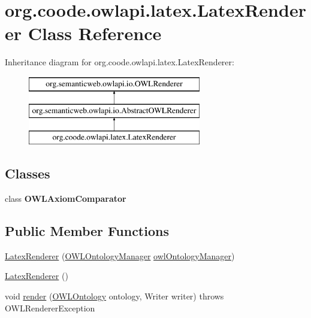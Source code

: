 \hypertarget{classorg_1_1coode_1_1owlapi_1_1latex_1_1_latex_renderer}{\section{org.\-coode.\-owlapi.\-latex.\-Latex\-Renderer Class Reference}
\label{classorg_1_1coode_1_1owlapi_1_1latex_1_1_latex_renderer}
}
Inheritance diagram for org.\-coode.\-owlapi.\-latex.\-Latex\-Renderer\-:\begin{figure}[H]
\begin{center}
\leavevmode
\includegraphics[height=3.000000cm]{classorg_1_1coode_1_1owlapi_1_1latex_1_1_latex_renderer}
\end{center}
\end{figure}
\subsection*{Classes}
\begin{DoxyCompactItemize}
\item 
class {\bfseries O\-W\-L\-Axiom\-Comparator}
\end{DoxyCompactItemize}
\subsection*{Public Member Functions}
\begin{DoxyCompactItemize}
\item 
\hyperlink{classorg_1_1coode_1_1owlapi_1_1latex_1_1_latex_renderer_a7705fd36118a316ac71867a61cd6c3a8}{Latex\-Renderer} (\hyperlink{interfaceorg_1_1semanticweb_1_1owlapi_1_1model_1_1_o_w_l_ontology_manager}{O\-W\-L\-Ontology\-Manager} \hyperlink{classorg_1_1semanticweb_1_1owlapi_1_1io_1_1_abstract_o_w_l_renderer_abb9888586f19a7a923cba542d99f1556}{owl\-Ontology\-Manager})
\item 
\hyperlink{classorg_1_1coode_1_1owlapi_1_1latex_1_1_latex_renderer_a4018e19fc4aa6b22cb26315f944852af}{Latex\-Renderer} ()
\item 
void \hyperlink{classorg_1_1coode_1_1owlapi_1_1latex_1_1_latex_renderer_a2eba9a5959a9be2c9a95222052336ecf}{render} (\hyperlink{interfaceorg_1_1semanticweb_1_1owlapi_1_1model_1_1_o_w_l_ontology}{O\-W\-L\-Ontology} ontology, Writer writer)  throws O\-W\-L\-Renderer\-Exception 
\end{DoxyCompactItemize}
